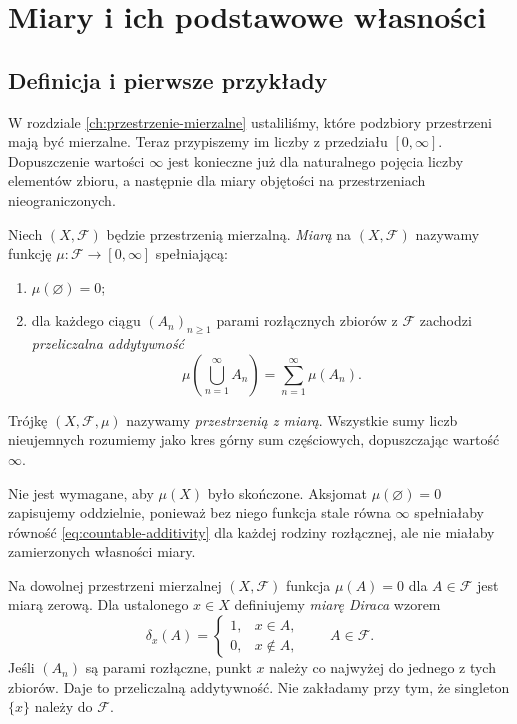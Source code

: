 \chapter{Miary i ich podstawowe własności}
\label{ch:miary-wlasnosci}

\section{Definicja i pierwsze przykłady}

W rozdziale \ref{ch:przestrzenie-mierzalne} ustaliliśmy, które podzbiory
przestrzeni mają być mierzalne. Teraz przypiszemy im liczby z przedziału
$[0,\infty]$. Dopuszczenie wartości $\infty$ jest konieczne już dla
naturalnego pojęcia liczby elementów zbioru, a następnie dla miary
objętości na przestrzeniach nieograniczonych.

\begin{definicja}[Miara]
\label{def:measure}
Niech $(X,\mathcal F)$ będzie przestrzenią mierzalną.
\emph{Miarą} na $(X,\mathcal F)$ nazywamy funkcję
$\mu:\mathcal F\to[0,\infty]$ spełniającą:
\begin{enumerate}
\item $\mu(\varnothing)=0$;
\item dla każdego ciągu $(A_n)_{n\geq1}$ parami rozłącznych zbiorów
z $\mathcal F$ zachodzi \emph{przeliczalna addytywność}
\begin{equation}
\label{eq:countable-additivity}
\mu\left(\bigcup_{n=1}^{\infty}A_n\right)
=\sum_{n=1}^{\infty}\mu(A_n).
\end{equation}
\end{enumerate}
Trójkę $(X,\mathcal F,\mu)$ nazywamy \emph{przestrzenią z miarą}.
Wszystkie sumy liczb nieujemnych rozumiemy jako kres górny sum
częściowych, dopuszczając wartość $\infty$.
\end{definicja}

\begin{uwaga}
Nie jest wymagane, aby $\mu(X)$ było skończone. Aksjomat
$\mu(\varnothing)=0$ zapisujemy oddzielnie, ponieważ bez niego
funkcja stale równa $\infty$ spełniałaby równość
\eqref{eq:countable-additivity} dla każdej rodziny rozłącznej,
ale nie miałaby zamierzonych własności miary.
\end{uwaga}

\begin{przyklad}
\label{ex:dirac}
Na dowolnej przestrzeni mierzalnej $(X,\mathcal F)$ funkcja
$\mu(A)=0$ dla $A\in\mathcal F$ jest miarą zerową.
Dla ustalonego $x\in X$ definiujemy \emph{miarę Diraca} wzorem
\[
\delta_x(A)=\begin{cases}1,&x\in A,\\0,&x\notin A,\end{cases}
\qquad A\in\mathcal F.
\]
Jeśli $(A_n)$ są parami rozłączne, punkt $x$ należy co najwyżej
do jednego z tych zbiorów. Daje to przeliczalną addytywność.
Nie zakładamy przy tym, że singleton $\{x\}$ należy do $\mathcal F$.
\end{przyklad}

